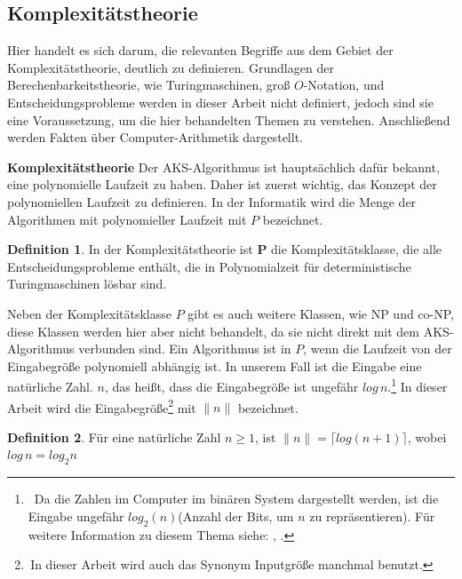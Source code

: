 \documentclass[12pt,oneside]{article}
\theoremstyle{remark}
\theoremstyle{definition}
\newtheorem{definition}{Definition}[section]
\begin{document}
\smallskip

\subsection{Komplexitätstheorie}

Hier handelt es sich darum, die relevanten Begriffe aus dem Gebiet der Komplexitätstheorie, deutlich zu definieren. Grundlagen der Berechenbarkeitstheorie, wie Turingmaschinen, groß $O$-Notation, und Entscheidungsprobleme werden in dieser Arbeit nicht definiert, jedoch sind sie eine Voraussetzung, um die hier behandelten Themen zu verstehen. Anschließend werden Fakten über Computer-Arithmetik dargestellt.\newline  

\textbf{\normalsize{Komplexitätstheorie}}\newline
Der AKS-Algorithmus ist hauptsächlich dafür bekannt, eine polynomielle Laufzeit zu haben. Daher ist zuerst wichtig, das Konzept der polynomiellen Laufzeit zu definieren. In der Informatik wird die Menge der Algorithmen mit polynomieller Laufzeit mit $P$ bezeichnet.

\begin{definition}
In der Komplexitätstheorie ist \textbf{P} die Komplexitätsklasse, die alle Entscheidungsprobleme enthält, die in Polynomialzeit für deterministische Turingmaschinen lösbar sind. 
\end{definition}

Neben der Komplexitätsklasse $P$ gibt es auch weitere Klassen, wie NP und co-NP, diese Klassen werden hier aber nicht behandelt, da sie nicht direkt mit dem AKS-Algorithmus verbunden sind. Ein Algorithmus ist in $P$, wenn die Laufzeit von der Eingabegröße polynomiell abhängig ist. In unserem Fall ist die Eingabe eine natürliche Zahl. $n$, das heißt, dass die Eingabegröße ist ungefähr $log \, n$.\footnote{$\,$ Da die Zahlen im Computer im binären System dargestellt werden, ist die Eingabe ungefähr $log_2(n)$(Anzahl der Bits, um $n$ zu repräsentieren). Für weitere Information zu diesem Thema siehe: \cite{D73}, \cite{computer-algebra}.} In dieser Arbeit wird die Eingabegröße\footnote{$\, $In dieser Arbeit wird auch das Synonym Inputgröße manchmal benutzt.} mit $\lVert n \rVert$ bezeichnet.   

\begin{definition}
Für eine natürliche Zahl $n \geq 1$, ist $\lVert n \rVert= \lceil log(n + 1) \rceil$, wobei $log \, n = log_{2} n$
\end{definition}
\end{document}
